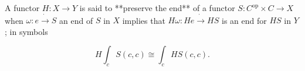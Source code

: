 A functor $H: X \rightarrow Y$ is said to **preserve the end** of a functor $S: C^{\text{op}} \times C \rightarrow X$ when $\omega: e \mathbin{\dot{\rightarrow}} S$ an end of $S$ in $X$ implies that $H\omega: He \mathbin{\dot{\rightarrow}} HS$ is an end for $HS$ in $Y$; in symbols

$$H \int_c S(c, c) \cong \int_c H S(c, c).$$
